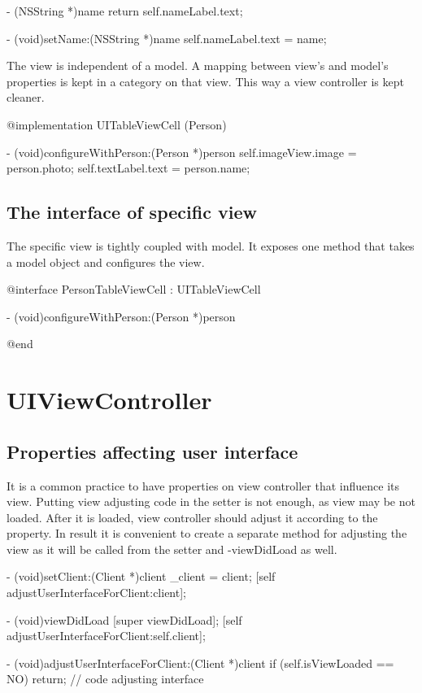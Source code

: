 \documentclass[10pt]{extarticle}
\newenvironment{codelisting}
{\footnotesize\mdframed[middlelinewidth=0.5pt, middlelinecolor=BaliHaiColor, skipabove=15pt]\verbatim}
{\endverbatim\endmdframed\vspace{12pt}\normalsize}
\begin{document}
\begin{codelisting}
- (NSString *)name
{
    return self.nameLabel.text;
}

- (void)setName:(NSString *)name
{
    self.nameLabel.text = name;
}
\end{codelisting}

The view is independent of a model. A mapping between view's and model's properties is kept in a category on that view. This way a view controller is kept cleaner.

\begin{codelisting}
@implementation UITableViewCell (Person)

- (void)configureWithPerson:(Person *)person
{
    self.imageView.image = person.photo;
    self.textLabel.text = person.name;
}
\end{codelisting}


\subsection{The interface of specific view}

The specific view is tightly coupled with model. It exposes one method that takes a model object and configures the view.

\begin{codelisting}
@interface PersonTableViewCell : UITableViewCell

- (void)configureWithPerson:(Person *)person

@end
\end{codelisting}


\section{UIViewController}

\subsection{Properties affecting user interface}

It is a common practice to have properties on view controller that influence its view. Putting view adjusting code in the setter is not enough, as view may be not loaded. After it is loaded, view controller should adjust it according to the property. In result it is convenient to create a separate method for adjusting the view as it will be called from the setter and -viewDidLoad as well.

\begin{codelisting}
- (void)setClient:(Client *)client
{
    _client = client;
    [self adjustUserInterfaceForClient:client];
}

- (void)viewDidLoad
{
    [super viewDidLoad];
    [self adjustUserInterfaceForClient:self.client];
}

- (void)adjustUserInterfaceForClient:(Client *)client
{
    if (self.isViewLoaded == NO) return;
    // code adjusting interface
}
\end{codelisting}
\end{document}
